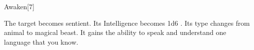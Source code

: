 \begin{spellsection}{Awaken}[7]
    \begin{spellheader}
    \end{spellheader}
    \begin{spellcontent}
        \begin{spelltargetinginfo}
        \end{spelltargetinginfo}
        \begin{spelleffects}
            \spelleffect The target becomes sentient. Its Intelligence becomes 1d6 . Its type changes from animal to magical beast. It gains the ability to speak and understand one language that you know.
        \end{spelleffects}
    \end{spellcontent}
    \begin{spellfooter}
    \end{spellfooter}
\end{spellsection}

